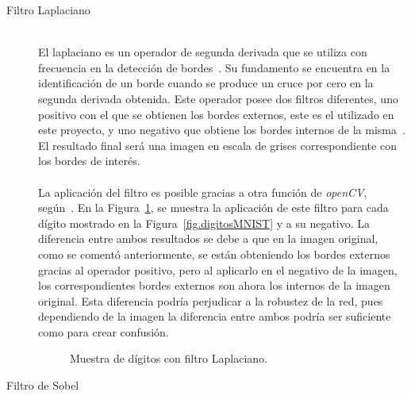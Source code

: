 \begin{description}
	\item[Filtro Laplaciano] \hfill 
	\vspace{5pt}
	\\
	El laplaciano es un operador de segunda derivada que se utiliza con frecuencia en la detección de bordes~\cite{laplacian}. Su fundamento se encuentra en la identificación de un borde cuando se produce un cruce por cero en la segunda derivada obtenida. Este operador posee dos filtros diferentes, uno positivo con el que se obtienen los bordes externos, este es el utilizado en este proyecto, y uno negativo que obtiene los bordes internos de la misma~\cite{laplacian2}. El resultado final será una imagen en escala de grises correspondiente con los bordes de interés.\\
	\vspace{-10pt}
	\\
	La aplicación del filtro es posible gracias a otra función de \textit{openCV}, según~\cite{laplacianOCV}. En la Figura~\ref{fig.laplacian}, se muestra la aplicación de este filtro para cada dígito mostrado en la Figura~\ref{fig.digitosMNIST} y a su negativo. La diferencia entre ambos resultados se debe a que en la imagen original, como se comentó anteriormente, se están obteniendo los bordes externos gracias al operador positivo, pero al aplicarlo en el negativo de la imagen, los correspondientes bordes externos son ahora los internos de la imagen original. Esta diferencia podría perjudicar a la robustez de la red, pues dependiendo de la imagen la diferencia entre ambos podría ser suficiente como para crear confusión.
	\begin{figure}[H]
		\centering
		 \hspace{10pt}
		\caption{Muestra de dígitos con filtro Laplaciano.}
		\label{fig.laplacian}
	\end{figure}
	\vspace{-10pt}
	\item[Filtro de Sobel] \hfill 

\end{description}

